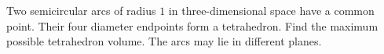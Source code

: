 Two semicircular arcs of radius $1$ in three-dimensional space have a common point. Their four diameter endpoints form a tetrahedron. Find the maximum possible tetrahedron volume. The arcs may lie in different planes.
